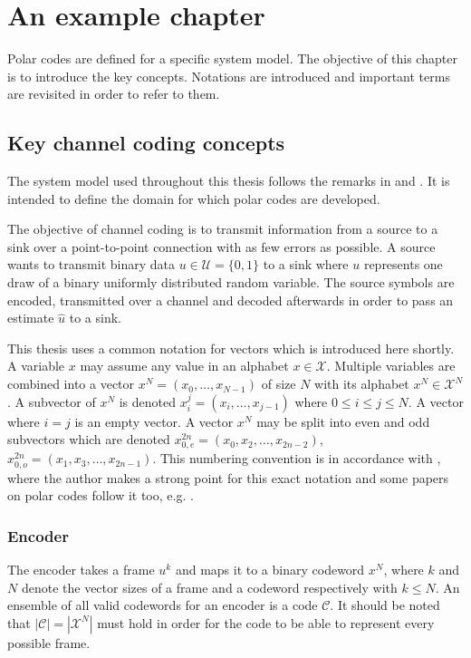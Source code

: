\acresetall
\chapter{An example chapter}\label{chapter:systemmodel}
Polar codes are defined for a specific system model.
The objective of this chapter is to introduce the key concepts.
Notations are introduced and important terms are revisited in order to refer to them.

\section{Key channel coding concepts}
The system model used throughout this thesis follows the remarks in \cite{Richardson:2008:MCT} and \cite{polar:arikan09}.
It is intended to define the domain for which polar codes are developed.

The objective of channel coding is to transmit information from a source to a sink over a point-to-point connection with as few errors as possible.
A source wants to transmit binary data  $u \in \mathcal{U} = \{0, 1\}$ to a sink where $u$ represents one draw of a binary uniformly distributed random variable.
The source symbols are encoded, transmitted over a channel and decoded afterwards in order to pass an estimate $\hat{u}$ to a sink.

This thesis uses a common notation for vectors which is introduced here shortly.
A variable $x$ may assume any value in an alphabet $x \in \mathcal{X}$.
Multiple variables are combined into a vector $x^N = (x_0, \dots , x_{N-1})$ of size $N$ with its alphabet $x^N \in \mathcal{X}^N$.
A subvector of $x^N$ is denoted $x_i^j = (x_i, \dots, x_{j-1})$ where $0 \leq i \leq j \leq N$.
A vector where $i=j$ is an empty vector.
A vector $x^N$ may be split into even and odd subvectors which are denoted $x_{0,e}^{2n} = (x_0, x_2, \dots, x_{2n-2})$, $x_{0,o}^{2n} = (x_1, x_3, \dots, x_{2n-1})$.
This numbering convention is in accordance with \cite{dijkstra:zerocounting}, where the author makes a strong point for this exact notation and some papers on polar codes follow it too, e.g. \cite{polar:talvardy:howtoCC}.


\subsection{Encoder}
The encoder takes a frame $u^k$ and maps it to a binary codeword $x^N$, where $k$ and $N$ denote the vector sizes of a frame and a codeword respectively with $k \leq N$.
An ensemble of all valid codewords for an encoder is a code $\mathcal{C}$.
It should be noted that $|\mathcal{C}| = |\mathcal{X}^N|$ must hold in order for the code to be able to represent every possible frame.

